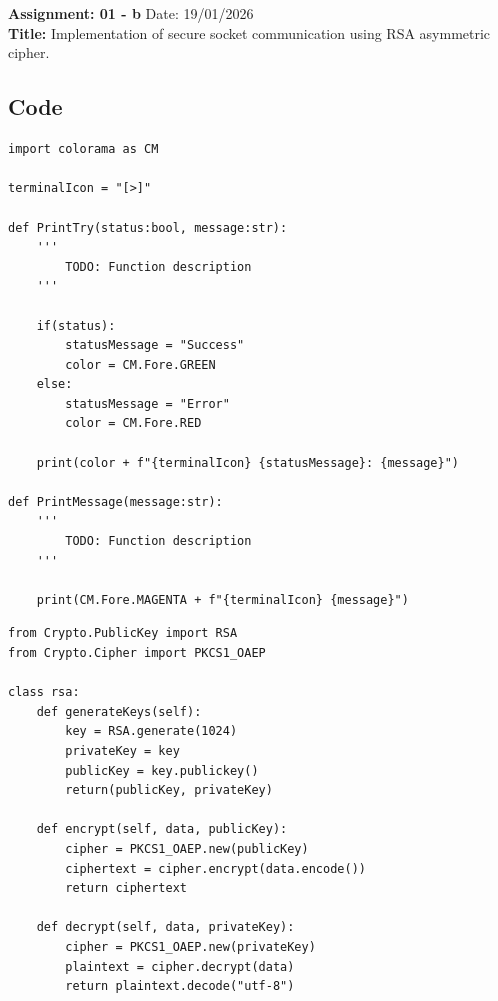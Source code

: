 \section{}
\noindent \textbf{Assignment: 01 - b}
\hfill Date: 19/01/2026 \\
\noindent
\textbf{Title:} Implementation of secure socket communication using RSA asymmetric cipher.

\subsection*{Code}
\begin{lstlisting}[style=mypython, caption={TerminalMessage.py}, label={code:A-1-b-TerminalMessage}]
import colorama as CM

terminalIcon = "[>]"

def PrintTry(status:bool, message:str):
    '''
        TODO: Function description
    '''

    if(status):
        statusMessage = "Success"
        color = CM.Fore.GREEN
    else:
        statusMessage = "Error"
        color = CM.Fore.RED

    print(color + f"{terminalIcon} {statusMessage}: {message}")

def PrintMessage(message:str):
    '''
        TODO: Function description
    '''

    print(CM.Fore.MAGENTA + f"{terminalIcon} {message}")
\end{lstlisting}

\begin{lstlisting}[style=mypython, caption={Encryption.py}, label={code:A-1-b-Encryption}]
from Crypto.PublicKey import RSA
from Crypto.Cipher import PKCS1_OAEP

class rsa:
    def generateKeys(self):
        key = RSA.generate(1024)
        privateKey = key
        publicKey = key.publickey()
        return(publicKey, privateKey)

    def encrypt(self, data, publicKey):
        cipher = PKCS1_OAEP.new(publicKey)
        ciphertext = cipher.encrypt(data.encode())
        return ciphertext

    def decrypt(self, data, privateKey):
        cipher = PKCS1_OAEP.new(privateKey)
        plaintext = cipher.decrypt(data)
        return plaintext.decode("utf-8")
\end{lstlisting}

